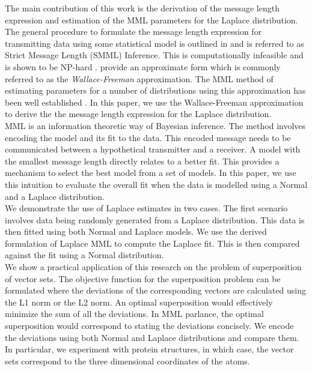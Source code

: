 \documentclass[wcp]{jmlr}
\begin{document}
The main contribution of this work is the derivation of the message length 
expression and estimation of the MML parameters for the Laplace distribution.
The general procedure to formulate the message length expression for transmitting
data using some statistical model is outlined in \citet{wallace-87} and is 
referred to as Strict Message Length (SMML) Inference. This is computationally
infeasible and is shown to be NP-hard \citep{Farr01012002}. \citet{wallace-87}
provide an approximate form which is commonly referred to as the 
\emph{Wallace-Freeman} approximation. The MML method
of estimating parameters for a number of distributions using this approximation
has been well established \citep{WallaceBook}. In this paper, we use the 
Wallace-Freeman approximation
to derive the the message length expression for the Laplace distribution. \\

MML is an information theoretic way of Bayesian inference. The method involves
encoding the model and its fit to the data. This encoded message needs to be communicated
between a hypothetical transmitter and a receiver. A model with the smallest message
length directly relates to a better fit. This provides a mechanism to select the
best model from a set of models. In this paper, we use this intuition to 
evaluate the overall fit when the data is modelled  using a Normal and a Laplace distribution. \\

We demonstrate the use of Laplace estimates in two cases. 
The first scenario involves data being randomly
generated from a Laplace distribution. This data is then fitted using
both Normal and Laplace models. We use the derived formulation of Laplace MML to
compute the Laplace fit. This is then compared against the fit using a Normal
distribution. \\

We show a practical application of this research on the problem of superposition of 
vector sets. The objective function for the superposition problem can be formulated
where the deviations of the corresponding vectors are calculated using the L1 norm 
or the L2 norm. An optimal superposition would effectively minimize the sum of all
the deviations. In MML parlance, the optimal superposition would correspond to stating
the deviations concisely. We encode the deviations using both Normal and Laplace
distributions and compare them. In particular, we experiment with protein structures,
in which case, the vector sets correspond to the three dimensional coordinates of the atoms.
\end{document}
